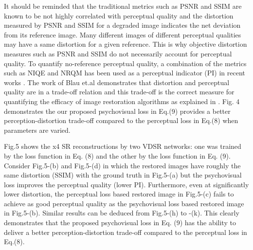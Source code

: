 \documentclass[10pt,twocolumn,letterpaper]{article}
\begin{document}
It should be reminded that the traditional metrics such as PSNR and SSIM are known to be not highly correlated with perceptual quality and the distortion measured by PSNR and SSIM for a degraded image indicates the net deviation from its reference image. Many different images of different perceptual qualities may have a same distortion for a given reference. This is why objective distortion measures such as PSNR and SSIM do not necessarily account for perceptual quality. To quantify no-reference perceptual quality, a combination of the metrics such as NIQE\cite{28} and NRQM\cite{31} has been used as a perceptual indicator (PI) in recent works \cite{29}. The work of Blau et.al \cite{5} demonstrates that distortion and perceptual quality are in a trade-off relation and this trade-off is the correct measure for quantifying the efficacy of image restoration algorithms as explained in \cite{29}. Fig. 4 demonstrates the our proposed psychovisual loss in Eq.(9) provides a better perception-distortion trade-off compared to the perceptual loss in Eq.(8) when parameters are varied.

Fig.5 shows the x4 SR reconstructions by two VDSR networks: one was trained by the loss function in Eq. (8) and the other by the loss function in Eq. (9). Consider Fig.5-(b) and Fig.5-(d) in which the restored images have roughly the same distortion (SSIM)  with the ground truth in Fig.5-(a) but the psychovisual loss improves the perceptual quality (lower PI). Furthermore, even at significantly lower distortion, the perceptual loss based restored image in Fig.5-(c) fails to achieve as good perceptual quality as the psychovisual loss based restored image in  Fig.5-(b). Similar results can be deduced from Fig.5-(h) to -(k). This clearly demonstrates that the proposed psychovisual loss in Eq. (9) has the ability to deliver a better perception-distortion trade-off compared to the perceptual loss in Eq.(8).
\end{document}
